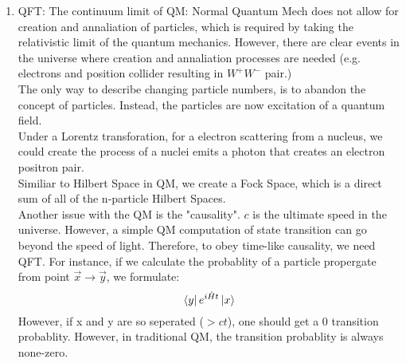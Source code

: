 \documentclass{article}
\begin{document}
\begin{enumerate}
\item QFT: The continuum limit of QM: Normal Quantum Mech does not allow for creation and annaliation of particles, which is required by taking the relativistic limit of the quantum mechanics. However, there are clear events in the universe where creation and annaliation processes are needed (e.g. electrons and position collider resulting in $W^+ W^-$ pair.) \\ 
  The only way to describe changing particle numbers, is to abandon the concept of particles. Instead, the particles are now excitation of a quantum field. \\ 
  Under a Lorentz transforation, for a electron scattering from a nucleus, we could create the process of a nuclei emits a photon that creates an electron positron pair. \\ 
  Similiar to Hilbert Space in QM, we create a Fock Space, which is a direct sum of all of the n-particle Hilbert Spaces. \\ 
  Another issue with the QM is the "causality". $c$ is the ultimate speed in the universe. However, a simple QM computation of state transition can go beyond the speed of light. Therefore, to obey time-like causality, we need QFT. For instance, if we calculate the probablity of a particle propergate from point $\vec{x} \to \vec{y}$, we formulate:
  \begin{equation*}
  \bra{y} e^{i \hat{H} t} \ket{x} 
  \end{equation*} 
  However, if x and y are so seperated ($>ct$), one should get a 0 transition probablity. However, in traditional QM, the transition probablity is always none-zero.
\end{enumerate}
\end{document}
